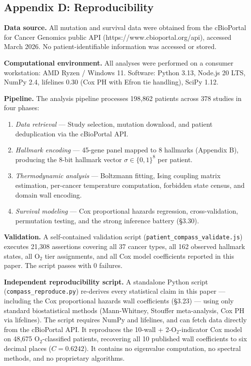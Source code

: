 \documentclass[
  11pt,
]{article}
\providecommand{\tightlist}{%
  \setlength{\itemsep}{0pt}\setlength{\parskip}{0pt}}
\begin{document}
\subsection{Appendix D:
Reproducibility}\label{appendix-d-reproducibility}

\textbf{Data source.} All mutation and survival data were obtained from
the cBioPortal for Cancer Genomics public API
(https://www.cbioportal.org/api), accessed March 2026. No
patient-identifiable information was accessed or stored.

\textbf{Computational environment.} All analyses were performed on a
consumer workstation: AMD Ryzen / Windows 11. Software: Python 3.13,
Node.js 20 LTS, NumPy 2.4, lifelines 0.30 (Cox PH with Efron tie
handling), SciPy 1.12.

\textbf{Pipeline.} The analysis pipeline processes 198,862 patients
across 378 studies in four phases:

\begin{enumerate}
\def\labelenumi{\arabic{enumi}.}
\tightlist
\item
  \emph{Data retrieval} --- Study selection, mutation download, and
  patient deduplication via the cBioPortal API.
\item
  \emph{Hallmark encoding} --- 45-gene panel mapped to 8 hallmarks
  (Appendix B), producing the 8-bit hallmark vector
  \(\sigma \in \{0,1\}^8\) per patient.
\item
  \emph{Thermodynamic analysis} --- Boltzmann fitting, Ising coupling
  matrix estimation, per-cancer temperature computation, forbidden state
  census, and domain wall encoding.
\item
  \emph{Survival modeling} --- Cox proportional hazards regression,
  cross-validation, permutation testing, and the strong inference
  battery (§3.30).
\end{enumerate}

\textbf{Validation.} A self-contained validation script
(\texttt{patient\_compass\_validate.js}) executes 21,308 assertions
covering all 37 cancer types, all 162 observed hallmark states, all
O\(_2\) tier assignments, and all Cox model coefficients reported in
this paper. The script passes with 0 failures.

\textbf{Independent reproducibility script.} A standalone Python script
(\texttt{compass\_reproduce.py}) re-derives every statistical claim in
this paper --- including the Cox proportional hazards wall coefficients
(§3.23) --- using only standard biostatistical methods (Mann-Whitney,
Stouffer meta-analysis, Cox PH via lifelines). The script requires NumPy
and lifelines, and can fetch data directly from the cBioPortal API. It
reproduces the 10-wall + 2-O\(_2\)-indicator Cox model on 48,675
O\(_2\)-classified patients, recovering all 10 published wall
coefficients to six decimal places (\(C = 0.6242\)). It contains no
eigenvalue computation, no spectral methods, and no proprietary
algorithms.
\end{document}
